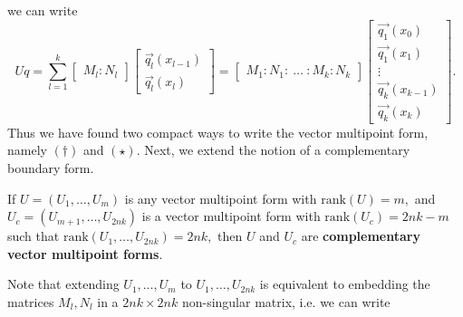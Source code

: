 \documentclass[10pt,reqno,oneside,a4paper]{article}
\begin{document}
we can write 
\[ Uq = \sum^k_{l=1}\begin{bmatrix} M_l : N_l \end{bmatrix}
\begin{bmatrix}
\vec{q_l}(x_{l-1})  \\
\vec{q_l}(x_{l})
\end{bmatrix} = 
\begin{bmatrix} M_1 : N_1 :~ \ldots ~: M_k : N_k \end{bmatrix} 
\begin{bmatrix}
\vec{q_1}(x_{0})  \\
\vec{q_1}(x_{1}) \\
\vdots \\
\vec{q_k}(x_{k-1})  \\
\vec{q_k}(x_{k})
\end{bmatrix}. \tag{$\star$}
\]
Thus we have found two compact ways to write the vector multipoint form, namely $(\dagger)$ and $(\star).$ Next, we extend the notion of a complementary boundary form.
\begin{defn}
If $U = (U_1, \ldots, U_m)$ is any vector multipoint form with $\mathrm{rank}(U) = m,$ and $U_c = (U_{m+1}, \ldots, U_{2nk})$ is a vector multipoint form with $\mathrm{rank}(U_c) = 2nk-m$ such that $\mathrm{rank}(U_{1}, \ldots, U_{2nk}) = 2nk,$ then $U$ and $U_c$ are \textbf{complementary vector multipoint forms}. 
\end{defn}
Note that extending $U_1, \ldots, U_m$ to $U_{1}, \ldots, U_{2nk}$ is equivalent to embedding the matrices $M_l, N_l$ in a $2nk \times 2nk$ non-singular matrix, i.e. we can write
\end{document}
